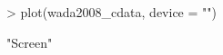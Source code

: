 \begin{Schunk}
\begin{Sinput}
> plot(wada2008_cdata, device = "")
\end{Sinput}
\begin{Soutput}
[1] "Screen"
\end{Soutput}
\end{Schunk}
